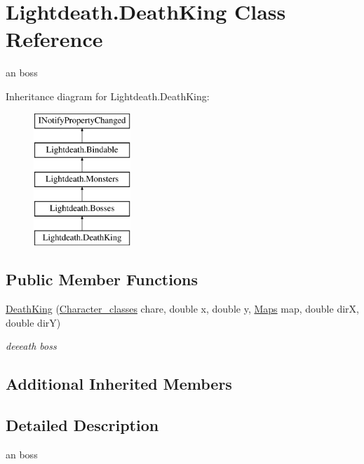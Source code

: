 \hypertarget{class_lightdeath_1_1_death_king}{}\section{Lightdeath.\+Death\+King Class Reference}
\label{class_lightdeath_1_1_death_king}


an boss  


Inheritance diagram for Lightdeath.\+Death\+King\+:\begin{figure}[H]
\begin{center}
\leavevmode
\includegraphics[height=5.000000cm]{class_lightdeath_1_1_death_king}
\end{center}
\end{figure}
\subsection*{Public Member Functions}
\begin{DoxyCompactItemize}
\item 
\hyperlink{class_lightdeath_1_1_death_king_a824a76a0dbd436343b50d89f68a0c3bb}{Death\+King} (\hyperlink{class_lightdeath_1_1_character__classes}{Character\+\_\+classes} chare, double x, double y, \hyperlink{class_lightdeath_1_1_maps}{Maps} map, double dirX, double dirY)
\begin{DoxyCompactList}\small\item\em deeeath boss \end{DoxyCompactList}\end{DoxyCompactItemize}
\subsection*{Additional Inherited Members}


\subsection{Detailed Description}
an boss 



